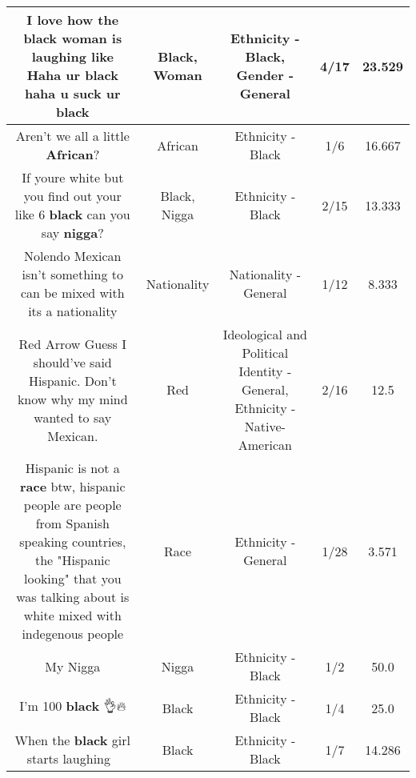 \documentclass[11pt]{article}
\newlength\mylength
\begin{document}
\begin{center}
\begin{longtable}{|C{.65\mylength}|C{.30\mylength}|C{.12\mylength}|C{.12\mylength}|C{.12\mylength}|}
  \small I love how the \textbf{black} \textbf{woman} is laughing like Haha ur \textbf{black} haha u suck ur black\normalsize   & Black, Woman & Ethnicity - Black, Gender - General & 4/17 & 23.529 \\  \hline
  \small Aren't we all a little \textbf{African}?\normalsize   & African & Ethnicity - Black & 1/6 & 16.667 \\  \hline
  \small If youre white but you find out your like 6 \textbf{black} can you say \textbf{nigga}?\normalsize   & Black, Nigga & Ethnicity - Black & 2/15 & 13.333 \\  \hline
  \small Nolendo Mexican isn't something to  can be mixed with its a nationality\normalsize   & Nationality & Nationality - General & 1/12 & 8.333 \\  \hline
  \small Red Arrow Guess I should've said Hispanic. Don't know why my mind wanted to say Mexican.\normalsize   & Red &  Ideological and Political Identity - General, Ethnicity - Native-American & 2/16 & 12.5 \\  \hline
  \small Hispanic is not a \textbf{race} btw, hispanic people are people from Spanish speaking countries, the "Hispanic looking" that you was talking about is white mixed with indegenous people\normalsize   & Race & Ethnicity - General & 1/28 & 3.571 \\  \hline
  \small My Nigga\normalsize   & Nigga & Ethnicity - Black & 1/2 & 50.0 \\  \hline
  \small I'm 100 \textbf{black} 👌🔥\normalsize   & Black & Ethnicity - Black & 1/4 & 25.0 \\  \hline
  \small When the \textbf{black} girl starts laughing 🤣\normalsize   & Black & Ethnicity - Black & 1/7 & 14.286 \\  \hline

\end{longtable}
\end{center}
\end{document}
